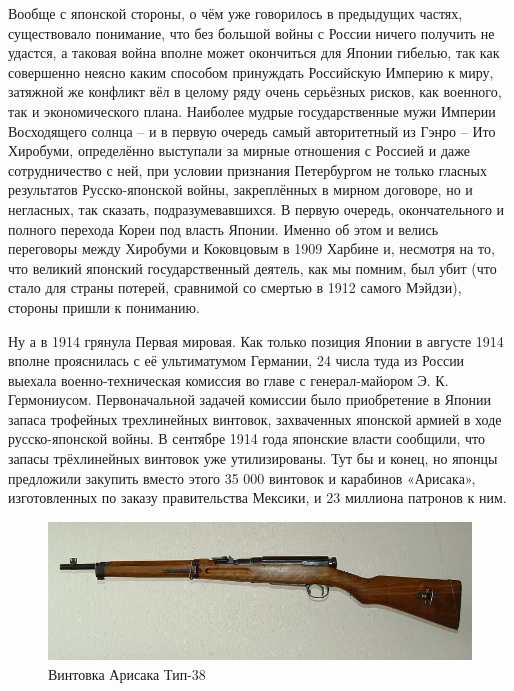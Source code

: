 Вообще с японской стороны, о чём уже говорилось в предыдущих частях, существовало понимание, что без большой войны с России ничего получить не удастся, а таковая война вполне может окончиться для Японии гибелью, так как совершенно неясно каким способом принуждать Российскую Империю к миру, затяжной же конфликт вёл в целому ряду очень серьёзных рисков, как военного, так и экономического плана. Наиболее мудрые государственные мужи Империи Восходящего солнца – и в первую очередь самый авторитетный из Гэнро – Ито Хиробуми, определённо выступали за мирные отношения с Россией и даже сотрудничество с ней, при условии признания Петербургом не только гласных результатов Русско-японской войны, закреплённых в мирном договоре, но и негласных, так сказать, подразумевавшихся. В первую очередь, окончательного и полного перехода Кореи под власть Японии. Именно об этом и велись переговоры между Хиробуми и Коковцовым в 1909 Харбине и, несмотря на то, что великий японский государственный деятель, как мы помним, был убит (что стало для страны потерей, сравнимой со смертью в 1912 самого Мэйдзи), стороны пришли к пониманию.

Ну а в 1914 грянула Первая мировая. Как только позиция Японии в августе 1914 вполне прояснилась с её ультиматумом Германии, 24 числа туда из России выехала военно-техническая комиссия во главе с генерал-майором Э. К. Гермониусом. Первоначальной задачей комиссии было приобретение в Японии запаса трофейных трехлинейных винтовок, захваченных японской армией в ходе русско-японской войны. В сентябре 1914 года японские власти сообщили, что запасы трёхлинейных винтовок уже утилизированы. Тут бы и конец, но японцы предложили закупить вместо этого 35 000 винтовок и карабинов «Арисака», изготовленных по заказу правительства Мексики, и 23 миллиона патронов к ним. 

\begin{figure}[h!tb] 
	\centering\includegraphics[scale=0.4]{Glava5/aPLBzctcRUE.jpg}
	\caption{Винтовка Арисака Тип-38}%
\end{figure}

